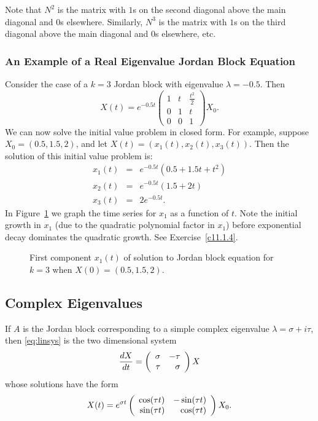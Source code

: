\documentclass{ximera}
\begin{document}
Note that $N^2$ is the matrix with $1$s on the second diagonal above the main
diagonal and $0$s elsewhere.  Similarly, $N^3$ is the matrix with $1$s on the 
third diagonal above the main diagonal and $0$s elsewhere, etc.
 

\subsubsection*{An Example of a Real Eigenvalue Jordan Block Equation}

Consider the case of a $k=3$ Jordan block with eigenvalue $\lambda=-0.5$.  
Then
\[
X(t) = e^{-0.5t} \left(\begin{array}{ccc} 1 & t & \frac{t^2}{2} \\
0 & 1 & t \\ 0 & 0 & 1 \end{array}\right)X_0.
\]
We can now solve the initial value problem
 in closed form.  For example,
suppose $X_0=(0.5,1.5,2)$, and let $X(t)=(x_1(t),x_2(t),x_3(t))$.  Then 
the solution of this initial value problem is:
\begin{equation}  \label{E:x1examp}
\begin{array}{rcl}
x_1(t) & = & e^{-0.5t}(0.5 + 1.5t + t^2) \\
x_2(t) & = & e^{-0.5t}(1.5 + 2t) \\
x_3(t) & = & 2e^{-0.5t}.
\end{array}
\end{equation}
In Figure~\ref{F:Jordan} we graph the time series for $x_1$ as a
function of $t$.  Note the initial growth in $x_1$ (due to the quadratic 
polynomial factor in $x_1$) before exponential decay 
dominates the quadratic growth.  See Exercise~\ref{c11.1.4}.

\begin{figure}[htb]
     \centerline{%
     }
     \caption{First component $x_1(t)$ of solution to
	Jordan block equation for $k=3$ when $X(0)=(0.5,1.5,2)$.}
     \label{F:Jordan}
\end{figure}

\subsection*{Complex Eigenvalues}

If $A$ is the Jordan block corresponding to a simple complex eigenvalue
$\lambda=\sigma+i\tau$, then \eqref{eq:linsys} is the two dimensional system 
\[
\frac{dX}{dt}=\left(\begin{array}{rr} \sigma & -\tau\\ \tau &\sigma\end{array}\right) X
\]
whose solutions have the form 
\[
X(t)=e^{\sigma t}\left(\begin{array}{rr} \cos(\tau t) & -\sin(\tau t)\\ \sin(\tau t) &\cos(\tau t)\end{array}\right) X_0.
\]
\end{document}
